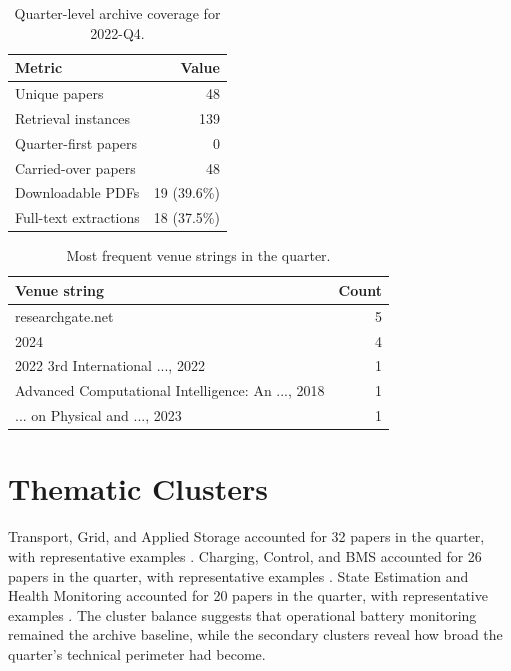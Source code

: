 \documentclass[conference]{IEEEtran}
\begin{document}
\begin{table}[t]
\caption{Quarter-level archive coverage for 2022-Q4.}
\label{tab:quarter_stats}
\centering
\footnotesize
\begin{tabular}{lr}
\toprule
Metric & Value \\
\midrule
Unique papers & 48 \\
Retrieval instances & 139 \\
Quarter-first papers & 0 \\
Carried-over papers & 48 \\
Downloadable PDFs & 19 (39.6\%) \\
Full-text extractions & 18 (37.5\%) \\
\bottomrule
\end{tabular}
\end{table}

\begin{table}[t]
\caption{Most frequent venue strings in the quarter.}
\label{tab:venues}
\centering
\footnotesize
\begin{tabularx}{\linewidth}{Xr}
\toprule
Venue string & Count \\
\midrule
researchgate.net & 5 \\
2024 & 4 \\
2022 3rd International ..., 2022 & 1 \\
Advanced Computational Intelligence: An ..., 2018 & 1 \\
... on Physical and ..., 2023 & 1 \\
\bottomrule
\end{tabularx}
\end{table}

\section{Thematic Clusters}
Transport, Grid, and Applied Storage accounted for 32 papers in the quarter, with representative examples \cite{machinelearningdriven2025,socestimationof2023}. Charging, Control, and BMS accounted for 26 papers in the quarter, with representative examples \cite{machinelearningdriven2025,socestimationof2023}. State Estimation and Health Monitoring accounted for 20 papers in the quarter, with representative examples \cite{socestimationof2023,participationofbattery2020}. The cluster balance suggests that operational battery monitoring remained the archive baseline, while the secondary clusters reveal how broad the quarter's technical perimeter had become.
\end{document}

